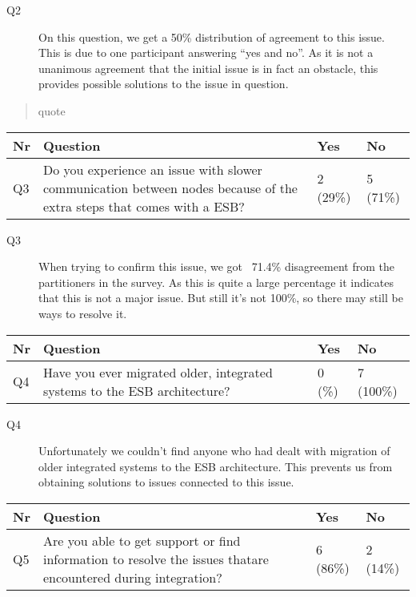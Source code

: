 \documentclass{llncs}
\begin{document}
\begin{description}
\item[Q2] On this question, we get a 50\% distribution of agreement to this issue. This is due to one participant answering “yes and no”. As it is not a unanimous agreement that the initial issue is in fact an obstacle, this provides possible solutions to the issue in question.
\end{description}

\begin{quote}
  quote
\end{quote}

\begin{tabular}{ | l | p{9cm} | l | l |}
\hline
Nr & Question & Yes & No \\ \hline
Q3 & Do you experience an issue with slower communication between nodes because of the extra steps that comes with a ESB? & 2 (29\%) & 5 (71\%) \\ \hline
\end{tabular}

\begin{description}
\item[Q3] When trying to confirm this issue, we got ~71.4\% disagreement from the partitioners in the survey. As this is quite a large percentage it indicates that this is not a major issue. But still it’s not 100\%, so there may still be ways to resolve it.
\end{description}

\begin{tabular}{ | l | p{9cm} | l | l |}
\hline
Nr & Question & Yes & No \\ \hline
Q4 & Have you ever migrated older, integrated systems to the ESB architecture? & 0 (\%) & 7 (100\%) \\ \hline
\end{tabular}

\begin{description}
\item[Q4]  Unfortunately we couldn’t find anyone who had dealt with migration of older integrated systems to the ESB architecture. This prevents us from obtaining solutions to issues connected to this issue.
\end{description}

\begin{tabular}{ | l | p{9cm} | l | l |}
\hline
Nr & Question & Yes & No\\ \hline
Q5 & Are you able to get support or find information to resolve the issues thatare encountered during integration? & 6 (86\%) & 2 (14\%)\\ \hline
\end{tabular}
\end{document}
